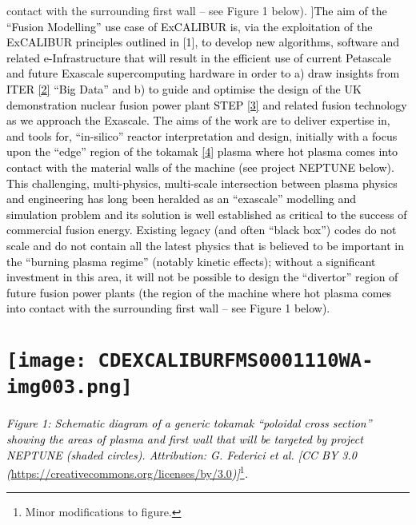\documentclass[a4paper]{article}
\newcommand\textstyleInternetlink[1]{\textcolor{blue}{#1}}
\begin{document}
contact with the surrounding first wall {}-- see Figure 1 below). ]{\textmd{\textcolor{black}{The aim of the ``Fusion
Modelling'' use case of ExCALIBUR is, via the exploitation of the ExCALIBUR principles outlined in [1], to develop new
algorithms, software and related e-Infrastructure that will result in the efficient use of current Petascale and future
Exascale supercomputing hardware in order to a) draw insights from ITER
}}\href{https://www.iter.org/}{\textstyleInternetlink{\textmd{\textcolor{black}{[2]}}}}\textmd{\textcolor{black}{ ``Big
Data'' and b) to guide and optimise the design of the UK demonstration nuclear fusion power plant STEP
}}\href{https://www.gov.uk/government/news/uk-to-take-a-big-step-to-fusion-electricity}{\textstyleInternetlink{\textmd{\textcolor{black}{[3]}}}}\textmd{\textcolor{black}{
and related fusion technology as we approach the Exascale. The aims of the work are to deliver expertise in, and tools
for, ``in-silico'' reactor interpretation and design, initially with a focus upon the ``edge'' region of the tokamak
}}\href{https://en.wikipedia.org/wiki/Tokamak}{\textstyleInternetlink{\textmd{\textcolor{black}{[4]}}}}\textmd{\textcolor{black}{
plasma where hot plasma comes into contact with the material walls of the machine (see project NEPTUNE below). This
challenging, multi-physics, multi-scale intersection between plasma physics and engineering has long been heralded as
an ``exascale'' modelling and simulation problem and its solution is well established as critical to the success of
commercial fusion energy. Existing legacy (and often ``black box'') codes do not scale and do not contain all the
latest physics that is believed to be important in the ``burning plasma regime'' (notably kinetic effects); without a
significant investment in this area, it will not be possible to design the ``divertor'' region of future fusion power
plants (the region of the machine where hot plasma comes into contact with the surrounding first wall -- see Figure 1
below). }}}

\bigskip

\section[]{ \texttt{[image: CDEXCALIBURFMS0001110WA-img003.png]} }
{
\textit{\textcolor{black}{Figure 1: Schematic diagram of a generic tokamak ``poloidal cross section'' showing the areas
of plasma and first wall that will be targeted by project NEPTUNE (shaded circles). Attribution: G. Federici et al. [CC
BY 3.0 (}}\url{https://creativecommons.org/licenses/by/3.0}\textit{\textcolor{black}{)]}}\footnote{
\foreignlanguage{english}{Minor modifications to figure.}}\textit{\textcolor{black}{.}}}
\end{document}
